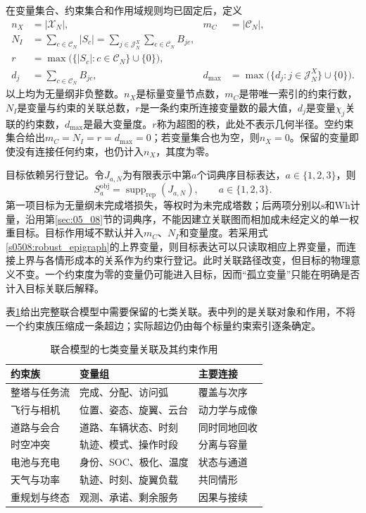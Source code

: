 在变量集合、约束集合和作用域规则均已固定后，定义
\begin{align}
 n_X&=|\mathcal X_N|,
 &m_C&=|\mathcal C_N|,
 \label{s0510:node_edge_counts}\\
 N_I&=\sum_{c\in\mathcal C_N}|S_c|
     =\sum_{j\in\mathcal J_N^X}\sum_{c\in\mathcal C_N}B_{jc},
 \label{s0510:incidence_count}\\
 r&=\max\bigl(\{|S_c|:c\in\mathcal C_N\}\cup\{0\}\bigr),
 \label{s0510:rank}\\
 d_j&=\sum_{c\in\mathcal C_N}B_{jc},
 &d_{\max}&=\max\bigl(\{d_j:j\in\mathcal J_N^X\}\cup\{0\}\bigr).
 \label{s0510:degrees}
\end{align}
以上均为无量纲非负整数。$n_X$是标量变量节点数，$m_C$是带唯一索引的约束行数，$N_I$是变量与约束的关联总数，$r$是一条约束所连接变量数的最大值，$d_j$是变量$\chi_j$关联的约束数，$d_{\max}$是最大变量度。$r$称为超图的秩，此处不表示几何半径。空约束集合给出$m_C=N_I=r=d_{\max}=0$；若变量集合也为空，则$n_X=0$。保留的变量即使没有连接任何约束，也仍计入$n_X$，其度为零。

目标依赖另行登记。令$J_{a,N}$为有限表示中第$a$个词典序目标表达，$a\in\{1,2,3\}$，则
\begin{equation}
 S_a^{\mathrm{obj}}
 =\operatorname{supp}_{\mathrm{rep}}(J_{a,N}),
 \qquad a\in\{1,2,3\}.
 \label{s0510:objective_support}
\end{equation}
第一项目标为无量纲未完成塔损失，等权时为未完成塔数；后两项分别以$\mathrm s$和$\mathrm{Wh}$计量，沿用第\ref{sec:05_08}节的词典序，不能因建立关联图而相加成未经定义的单一权重目标。目标作用域不默认并入$m_C$、$N_I$和变量度。若采用式\eqref{s0508:robust_epigraph}的上界变量，则目标表达可以只读取相应上界变量，而连接上界与各情形成本的关系作为约束行登记。此时关联路径改变，但目标的物理意义不变。一个约束度为零的变量仍可能进入目标，因而“孤立变量”只能在明确是否计入目标关联后解释。

表\ref{s0510:coupling_families}给出完整联合模型中需要保留的七类关联。表中列的是关联对象和作用，不将一个约束族压缩成一条超边；实际超边仍由每个标量约束索引逐条确定。

\begin{table}[htbp]
 \centering
 \small
 \caption{联合模型的七类变量关联及其约束作用}
 \label{s0510:coupling_families}
 \begin{tabular}{lll}\toprule
约束族 & 变量组 & 主要连接\\\midrule
整塔与任务流 & 完成、分配、访问弧 & 覆盖与次序\\
飞行与相机 & 位置、姿态、旋翼、云台 & 动力学与成像\\
道路与会合 & 道路、车辆状态、时刻 & 同时同地回收\\
时空冲突 & 轨迹、模式、操作时段 & 分离与容量\\
电池与充电 & 身份、SOC、极化、温度 & 状态与通道\\
天气与功率 & 轨迹、时刻、旋翼负载 & 共同情形\\
重规划与终态 & 观测、承诺、剩余服务 & 因果与接续\\\bottomrule
\end{tabular}
\end{table}

